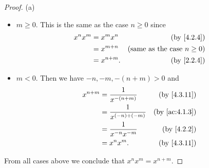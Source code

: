 \begin{proof}{(a)}
\begin{itemize}
\begin{itemize}
                  \begin{itemize}
                    \item \(m \geq 0\).
                          This is the same as the case \(n \geq 0\) since
                          \begin{align*}
                            x^n x^m & = x^m x^n    & \text{(by \cref{4.2.4})}               \\
                                    & = x^{m + n}  & \text{(same as the case \(n \geq 0\))} \\
                                    & = x^{n + m}. & \text{(by \cref{2.2.4})}
                          \end{align*}
                    \item \(m < 0\).
                          Then we have \(-n, -m, -(n + m) > 0\) and
                          \begin{align*}
                            x^{n + m} & = \frac{1}{x^{-(n + m)}}    & \text{(by \cref{4.3.11})}   \\
                                      & = \frac{1}{x^{(-n) + (-m)}} & \text{(by \cref{ac:4.1.3})} \\
                                      & = \frac{1}{x^{-n} x^{-m}}   & \text{(by \cref{4.2.2})}    \\
                                      & = x^n x^m.                  & \text{(by \cref{4.3.11})}
                          \end{align*}
                  \end{itemize}
          \end{itemize}
  \end{itemize}
  From all cases above we conclude that \(x^n x^m = x^{n + m}\).


\end{proof}
